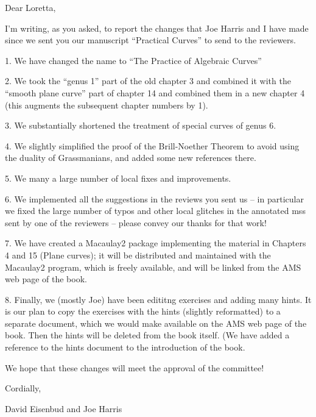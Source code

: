 Dear Loretta,

I'm writing, as you asked, to report the changes that Joe Harris and I have made since we sent you our manuscript ``Practical Curves'' to send to the reviewers.

1. We have changed the name to ``The Practice of Algebraic Curves''

2. We took the ``genus 1'' part of the old chapter 3 and combined it with the ``smooth plane curve'' part of chapter 14 and combined them in a new chapter 4 (this augments the subsequent chapter numbers by 1).

3. We substantially shortened the treatment of special curves of genus 6.

4. We slightly simplified the proof of the Brill-Noether Theorem to avoid using the duality of Grassmanians, and added some new references there.

5. We many a large number of local fixes and improvements.

6. We implemented all the suggestions in the reviews you sent us -- in particular we fixed the large number of typos and other local glitches in the annotated mss sent by one of the reviewers -- please convey our thanks for that work!

7. We have created a Macaulay2 package implementing the material in Chapters 4 and 15 (Plane curves); it will be distributed and maintained with the Macaulay2 program, which is freely available, and will be linked from the AMS web page of the book.

8. Finally, we (mostly Joe) have been edititng exercises and adding many hints. It is our plan to copy the exercises with the hints (slightly reformatted) to a separate document, which we would make available on the  AMS web page of the book. Then the hints will be deleted from the book itself. (We have added a reference to the hints document to the introduction of the book.

We hope that these changes will meet the approval of the committee!

Cordially,

David Eisenbud and Joe Harris







